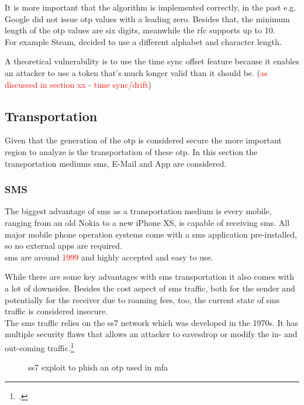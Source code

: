 It is more important that the algorithm is implemented correctly, in the past e.g. Google did not issue \gls{otp} values with a leading zero. Besides that, the minimum length of the \gls{otp} values are six digits, meanwhile the \gls{rfc} supports up to 10.\\
For example Steam, decided to use a different alphabet and character length.

A theoretical vulnerability is to use the time sync offset feature because it enables an attacker to use a token that's much longer valid than it should be. (\textcolor{red}{as discussed in section xx - time sync/drift})

\subsection{Transportation}

Given that the generation of the \gls{otp} is considered secure the more important region to analyze is the transportation of these \gls{otp}. In this section the transportation mediums \gls{sms}, E-Mail and App are considered.

\subsubsection{SMS}

The biggest advantage of \gls{sms} as a transportation medium is every mobile, ranging from an old Nokia to a new iPhone XS, is capable of receiving \gls{sms}. All major mobile phone operation systems come with a \gls{sms} application pre-installed, so no external apps are required.\\
\gls{sms} are around \textcolor{red}{1999} and highly accepted and easy to use.

\newpage

While there are some key advantages with \gls{sms} transportation it also comes with a lot of downsides. Besides the cost aspect of \gls{sms} traffic, both for the sender and potentially for the receiver due to roaming fees, too, the current state of \gls{sms} traffic is considered insecure.\\
The \gls{sms} traffic relies on the \gls{ss7} network which was developed in the 1970s. It has multiple security flaws that allows an attacker to eavesdrop or modify the in- and out-coming traffic.\footcite{WELCH201717,7997246,puzankov2017stealthy}

\begin{figure}[hbt]
	\centering
	
	\caption[\gls{ss7} exploit to phish an \gls{otp} used in \gls{mfa}]{\gls{ss7} exploit to phish an \gls{otp} used in \gls{mfa}\footnotemark}
	\label{fig:2fa_flow_ss7}
\end{figure}

